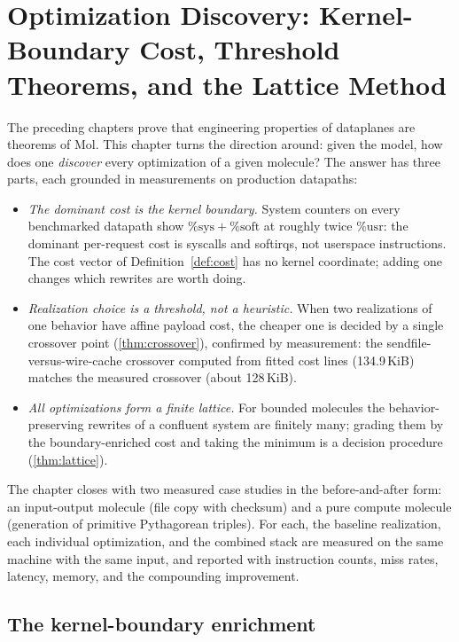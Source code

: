 \chapter{Optimization Discovery: Kernel-Boundary Cost, Threshold Theorems, and the Lattice Method}\label{ch:breakthroughs}

The preceding chapters prove that engineering properties of dataplanes
are theorems of Mol. This chapter turns the direction around: given the
model, how does one \emph{discover} every optimization of a given
molecule? The answer has three parts, each grounded in measurements on
production datapaths:

\begin{itemize}
\item \emph{The dominant cost is the kernel boundary.} System counters
  on every benchmarked datapath show $\mathrm{\%sys}+\mathrm{\%soft}$
  at roughly twice $\mathrm{\%usr}$: the dominant per-request cost is
  syscalls and softirqs, not userspace instructions. The cost vector of
  Definition~\ref{def:cost} has no kernel coordinate; adding one
  changes which rewrites are worth doing.
\item \emph{Realization choice is a threshold, not a heuristic.} When
  two realizations of one behavior have affine payload cost, the
  cheaper one is decided by a single crossover point
  (\autoref{thm:crossover}), confirmed by measurement: the
  sendfile-versus-wire-cache crossover computed from fitted cost lines
  (134.9\,KiB) matches the measured crossover (about 128\,KiB).
\item \emph{All optimizations form a finite lattice.} For bounded
  molecules the behavior-preserving rewrites of a confluent system are
  finitely many; grading them by the boundary-enriched cost and taking
  the minimum is a decision procedure (\autoref{thm:lattice}).
\end{itemize}

The chapter closes with two measured case studies in the
before-and-after form: an input-output molecule (file copy with
checksum) and a pure compute molecule (generation of primitive
Pythagorean triples). For each, the baseline realization, each
individual optimization, and the combined stack are measured on the
same machine with the same input, and reported with instruction counts,
miss rates, latency, memory, and the compounding improvement.

\section{The kernel-boundary enrichment}\label{sec:boundary}

